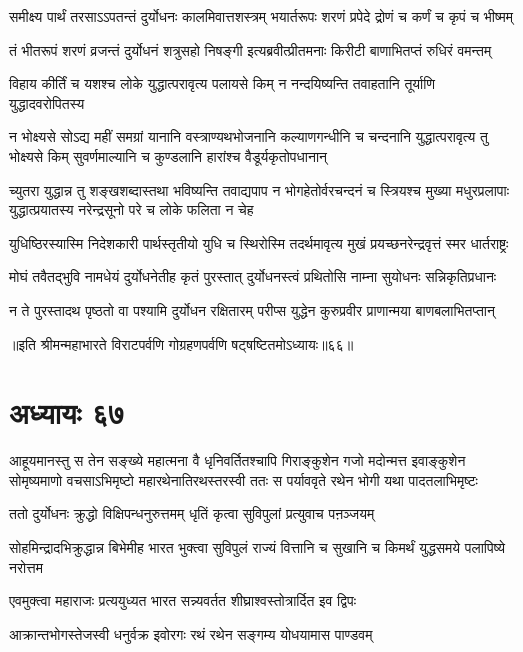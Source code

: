\twolineshloka
{समीक्ष्य पार्थं तरसाऽऽपतन्तं दुर्योधनः कालमिवात्तशस्त्रम्}
{भयार्तरूपः शरणं प्रपेदे द्रोणं च कर्णं च कृपं च भीष्मम्}


\twolineshloka
{तं भीतरूपं शरणं व्रजन्तं दुर्योधनं शत्रुसहो निषङ्गी}
{इत्यब्रवीत्प्रीतमनाः किरीटी बाणाभितप्तं रुधिरं वमन्तम्}


\twolineshloka
{विहाय कीर्तिं च यशश्च लोके युद्धात्परावृत्य पलायसे किम्}
{न नन्दयिष्यन्ति तवाहतानि तूर्याणि युद्धादवरोपितस्य}


\threelineshloka
{न भोक्ष्यसे सोऽद्य महीं समग्रां यानानि वस्त्राण्यथभोजनानि}
{कल्याणगन्धीनि च चन्दनानि युद्धात्परावृत्य तु भोक्ष्यसे किम्}
{सुवर्णमाल्यानि च कुण्डलानि हारांश्च वैडूर्यकृतोपधानान्}


\threelineshloka
{च्युतरा युद्धान्न तु शङ्खशब्दास्तथा भविष्यन्ति तवाद्यपाप}
{न भोगहेतोर्वरचन्दनं च स्त्रियश्च मुख्या मधुरप्रलापाः}
{युद्धात्प्रयातस्य नरेन्द्रसूनो परे च लोके फलिता न चेह}


\twolineshloka
{युधिष्ठिरस्यास्मि निदेशकारी पार्थस्तृतीयो युधि च स्थिरोस्मि}
{तदर्थमावृत्य मुखं प्रयच्छनरेन्द्रवृत्तं स्मर धार्तराष्ट्रः}


\twolineshloka
{मोघं तवैतद्भुवि नामधेयं दुर्योधनेतीह कृतं पुरस्तात्}
{दुर्योधनस्त्वं प्रथितोसि नाम्ना सुयोधनः सन्निकृतिप्रधानः}



\twolineshloka
{न ते पुरस्तादथ पृष्ठतो वा पश्यामि दुर्योधन रक्षितारम्}
{परीप्स युद्धेन कुरुप्रवीर प्राणान्मया बाणबलाभितप्तान्}

॥इति श्रीमन्महाभारते विराटपर्वणि गोग्रहणपर्वणि षट्षष्टितमोऽध्यायः॥६६॥

\chapter{अध्यायः ६७}
\onelineshloka
{आहूयमानस्तु स तेन सङ्ख्ये महात्मना वै धृनिवर्तितश्चापि गिराङ्कुशेन गजो मदोन्मत्त इवाङ्कुशेन}
\twolineshloka
{सोमृष्यमाणो वचसाऽभिमृष्टो महारथेनातिरथस्तरस्वी}
{ततः स पर्याववृते रथेन भोगी यथा पादतलाभिमृष्टः}


\twolineshloka
{ततो दुर्योधनः क्रुद्धो विक्षिपन्धनुरुत्तमम्}
{धृतिं कृत्वा सुविपुलां प्रत्युवाच पऩञ्जयम्}


\threelineshloka
{सोहमिन्द्रादभिक्रुद्धान्न बिभेमीह भारत}
{भुक्त्वा सुविपुलं राज्यं वित्तानि च सुखानि च}
{किमर्थं युद्धसमये पलापिष्ये नरोत्तम}


\twolineshloka
{एवमुक्त्वा महाराजः प्रत्ययुध्यत भारत}
{सन्न्यवर्तत शीघ्राश्वस्तोत्रार्दित इव द्विपः}


\twolineshloka
{आक्रान्तभोगस्तेजस्वी धनुर्वक्र इवोरगः}
{रथं रथेन सङ्गम्य योधयामास पाण्डवम्}


